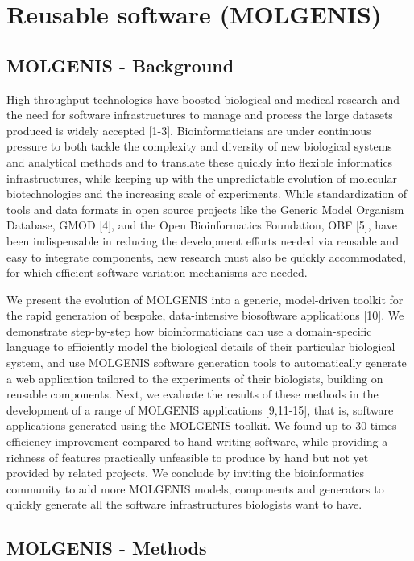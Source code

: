 \documentclass[8pt, twoside, a5paper]{report}
\begin{document}
\section{Reusable software (MOLGENIS)}
\subsection{MOLGENIS - Background}
High throughput technologies have boosted biological and medical research and the need for software infrastructures to 
manage and process the large datasets produced is widely accepted [1-3]. Bioinformaticians are under continuous pressure 
to both tackle the complexity and diversity of new biological systems and analytical methods and to translate these 
quickly into flexible informatics infrastructures, while keeping up with the unpredictable evolution of molecular 
biotechnologies and the increasing scale of experiments. While standardization of tools and data formats in open source 
projects like the Generic Model Organism Database, GMOD [4], and the Open Bioinformatics Foundation, OBF [5], have been 
indispensable in reducing the development efforts needed via reusable and easy to integrate components, new research 
must also be quickly accommodated, for which efficient software variation mechanisms are needed.

We present the evolution of MOLGENIS into a generic, model-driven toolkit for the rapid generation of bespoke, 
data-intensive biosoftware applications [10]. We demonstrate step-by-step how bioinformaticians can use a domain-specific 
language to efficiently model the biological details of their particular biological system, and use MOLGENIS software 
generation tools to automatically generate a web application tailored to the experiments of their biologists, building 
on reusable components. Next, we evaluate the results of these methods in the development of a range of MOLGENIS applications 
[9,11-15], that is, software applications generated using the MOLGENIS toolkit. We found up to 30 times efficiency improvement 
compared to hand-writing software, while providing a richness of features practically unfeasible to produce by hand but not 
yet provided by related projects. We conclude by inviting the bioinformatics community to add more MOLGENIS models, components 
and generators to quickly generate all the software infrastructures biologists want to have.

\subsection{MOLGENIS - Methods}
\end{document}

